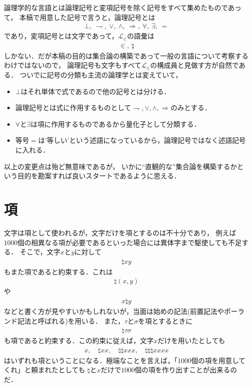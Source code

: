 	論理学的な言語とは論理記号と変項記号を除く記号をすべて集めたものであって，
	本稿で用意した記号で言うと，論理記号とは
	\begin{align}
		\bot,\ \rightharpoondown,\ \vee,\ \wedge,\ \Longrightarrow,\ \forall,\ \exists,\ =
	\end{align}
	であり，変項記号とは文字であって，$\mathcal{L}_{\in}$の語彙は
	\begin{align}
		\in,\ \natural
	\end{align}
	しかない．だが本稿の目的は集合論の構築であって一般の言語について考察するわけではないので，
	論理記号も文字もすべて$\mathcal{L}_{\in}$の構成員と見做す方が自然である．
	ついでに記号の分類も主流の論理学とは変えていて，
	\begin{itemize}
		\item $\bot$はそれ単体で式であるので他の記号とは分ける．
		\item 論理記号とは式に作用するものとして$\rightharpoondown,\vee,\wedge,\Longrightarrow$のみとする．
		\item $\forall$と$\exists$は項に作用するものであるから量化子として分類する．
		\item 等号$=$は'等しい'という述語になっているから，論理記号ではなく述語記号に入れる．
	\end{itemize}
	以上の変更点は殆ど無意味であるが，
	いかに``直観的な''集合論を構築するかという目的を勘案すれば良いスタートであるように思える．
	
\section{項}
	
	文字は項として使われるが，文字だけを項とするのは不十分であり，
	例えば$1000$個の相異なる項が必要であるといった場合には異体字まで駆使しても不足する．
	そこで，文字$x$と$y$に対して
	\begin{align}
		\natural xy
	\end{align}
	もまた項であると約束する．これは
	\begin{align}
		\natural(x,y)
	\end{align}
	や
	\begin{align}
		x \natural y
	\end{align}
	などと書く方が見やすいかもしれないが，当面は始めの記法(前置記法やポーランド記法と呼ばれる)を用いる．
	また，$\tau$と$\sigma$を項とするときに
	\begin{align}
		\natural \tau \sigma
	\end{align}
	も項であると約束する．この約束に従えば，文字$x$だけを用いたとしても
	\begin{align}
		x,\quad \natural xx, \quad \natural \natural xxx, \quad \natural \natural \natural xxxx
	\end{align}
	はいずれも項ということになる．極端なことを言えば，「$1000$個の項を用意してくれ」と頼まれたとしても
	$\natural$と$x$だけで$1000$個の項を作り出すことが出来るのだ．
	
